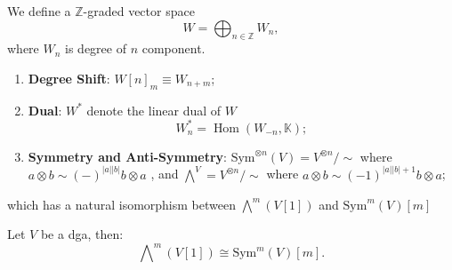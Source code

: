 \documentclass[10pt]{article}
\newcommand{\Hom}{\operatorname{Hom}}
\begin{document}
We define a $ \mathbb{Z}$-graded vector space
\begin{equation*}
  W = \bigoplus_{n \in \mathbb{Z}} W_{n},
\end{equation*}
where $ W_{n}$ is degree of $ n$ component.
\begin{enumerate}
  \item \textbf{Degree Shift}: $ W[n]_{m} \equiv W_{n+m}$;
  \item \textbf{Dual}: $ W^{*}$ denote the linear dual of $ W$
    \begin{equation*}
      W^{*}_{n} = \Hom(W_{-n}, \mathbb{K});
    \end{equation*}
  \item \textbf{Symmetry and Anti-Symmetry}: $ \mathrm{Sym}^{\otimes n}(V) = V^{\otimes n} / \sim $ where $a \otimes b \sim (-)^{|a||b|} b \otimes a$ ,
    and $ \bigwedge\nolimits^{V} = V^{\otimes n} / \sim $ where $ a \otimes b \sim (-1)^{|a||b|+1} b \otimes a$;
\end{enumerate}
which has a natural isomorphism between $\bigwedge\nolimits^{m} \left( V[1] \right) $ and $\mathrm{Sym}^{m} (V)[m]$
\begin{proposition}
  Let $ V$ be a dga, then:
  \begin{equation*}
    \bigwedge\nolimits^{m} \left( V[1] \right) \cong \mathrm{Sym}^{m} (V)[m].
  \end{equation*}
\end{proposition}
\end{document}
